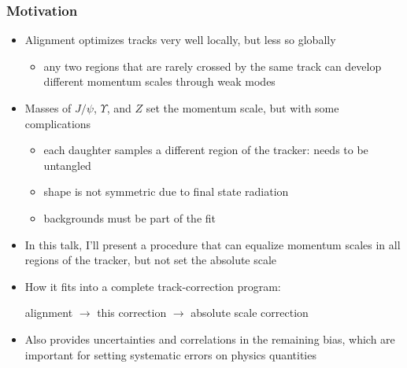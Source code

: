 \documentclass[compress]{beamer}
\begin{document}
\begin{frame}
\frametitle{Motivation}
\begin{itemize}
\item Alignment optimizes tracks very well locally, but less so globally
\begin{itemize}
\item any two regions that are rarely crossed by the same track can
  develop different momentum scales through weak modes
\end{itemize}
\item Masses of $J/\psi$, $\Upsilon$, and $Z$ set the momentum scale,
  but with some complications
\begin{itemize}
\item each daughter samples a different region of the tracker: needs to be untangled
\item shape is not symmetric due to final state radiation
\item backgrounds must be part of the fit
\end{itemize}
\item In this talk, I'll present a procedure that can equalize
  momentum scales in all regions of the tracker, but not set the absolute scale
\item How it fits into a complete track-correction program:
\begin{center}
alignment $\to$ this correction $\to$ absolute scale correction
\end{center}
\item Also provides uncertainties and correlations in the remaining bias,
  which are important for setting systematic errors on physics quantities
\end{itemize}
\end{frame}
\end{document}
